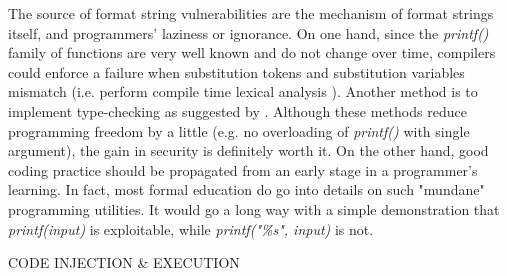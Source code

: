 The source of format string vulnerabilities are the mechanism of format strings itself, and programmers' laziness or ignorance. On one hand, since the \emph{printf()} family of functions are very well known and do not change over time, compilers could enforce a failure when substitution tokens and substitution variables mismatch (i.e. perform compile time lexical analysis \cite{alanpscan}). Another method is to implement type-checking as suggested by \cite{Weitz2014}. Although these methods reduce programming freedom by a little (e.g. no overloading of \emph{printf()} with single argument), the gain in security is definitely worth it. On the other hand, good coding practice should be propagated from an early stage in a programmer's learning. In fact, most formal education do go into details on such "mundane" programming utilities. It would go a long way with a simple demonstration that \emph{printf(input)} is exploitable, while \emph{printf("\%s", input)} is not.

CODE INJECTION \& EXECUTION